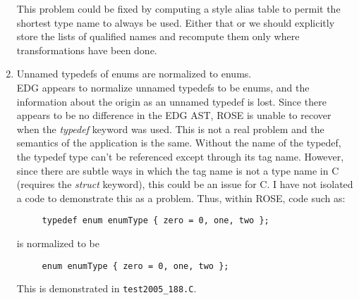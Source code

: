 \begin{enumerate}
       This problem could be fixed by computing a style alias table to permit the shortest
    type name to always be used.  Either that or we should explicitly store the lists of 
    qualified names and recompute them only where transformations have been
    done.


\item Unnamed typedefs of enums are normalized to enums. \\
     EDG appears to normalize unnamed typedefs to be enums, and the information about the 
     origin as an unnamed typedef is lost.  Since there appears to be no difference in the
     EDG AST, ROSE is unable to recover when the {\em typedef} keyword was used.  This is not
     a real problem and the semantics of the application is the same.  Without
     the name of the typedef, the typedef type can't be referenced except through its tag
     name.  However, since there are subtle ways in which the tag name is not a type name in
     C (requires the {\em struct} keyword), this could be an issue for C. I have not
     isolated a code to demonstrate this as a problem. Thus, within ROSE, code such as:
{\indent
{\mySmallFontSize
\begin{verbatim}
     typedef enum enumType { zero = 0, one, two };
\end{verbatim}
}}
     is normalized to be
{\indent
{\mySmallFontSize
\begin{verbatim}
     enum enumType { zero = 0, one, two };
\end{verbatim}
}}
     This is demonstrated in {\tt test2005\_188.C}.


\end{enumerate}
